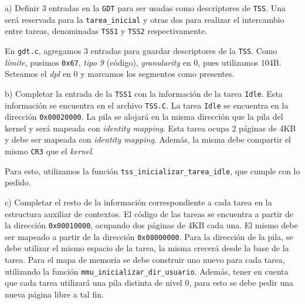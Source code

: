 \noindent
a) Definir 3 entradas en la \verb|GDT| para ser usadas como descriptores de \verb|TSS|. Una ser\'a reservada 
para la \verb|tarea_inicial| y otras dos para realizar el intercambio entre tareas, denominadas \verb|TSS1| 
y \verb|TSS2| respectivamente.

\vspace*{0.3cm}

En \verb|gdt.c|, agregamos 3 entradas para guardar descriptores de la \verb|TSS|. Como \textit{l\'imite}, pusimos \verb|0x67|, 
\textit{tipo 9} (c\'odigo), \textit{granularity} en 0, pues utilizamos 104B. Seteamos el \textit{dpl} en 0 y marcamos los segmentos 
como presentes. 

\vspace*{0.5cm} \noindent



\noindent
b) Completar la entrada de la \verb|TSS1| con la informaci\'on de la tarea \verb|Idle|. Esta informaci\'on se
encuentra en el archivo \verb|TSS.C|. La tarea \verb|Idle| se encuentra en la direcci\'on \verb|0x00020000|. La 
pila se alojar\'a en la misma direcci\'on que la pila del kernel y ser\'a mapeada con \textit{identity mapping}. 
Esta tarea ocupa 2 p\'aginas  de 4KB y debe ser mapeada con \textit{identity mapping}. Adem\'as, la misma debe 
compartir el mismo \verb|CR3| que el \textit{kernel}.

\vspace*{0.3cm}

Para esto, utilizamos la funci\'on \verb|tss_inicializar_tarea_idle|, que cumple con lo pedido.

\vspace*{0.5cm} \noindent



\noindent
c) Completar el resto de la informaci\'on correspondiente a cada tarea en la estructura auxiliar de contextos. El 
c\'odigo de las tareas se encuentra a partir de la direcci\'on \verb|0x00010000|, ocupando dos p\'aginas de 4KB cada una. 
El mismo debe ser mapeado a partir de la direcci\'on \verb|0x08000000|. Para la direcci\'on de la pila, se debe utilizar 
el mismo espacio de la tarea, la misma crecer\'a desde la base de la tarea. Para el mapa de memoria se debe construir uno 
nuevo para cada tarea, utilizando la funci\'on \verb|mmu_inicializar_dir_usuario|. Adem\'as, tener en cuenta que cada tarea 
utilizar\'a una pila distinta de nivel 0, para esto se debe pedir una nueva p\'agina libre a tal fin. 


\vspace*{0.3cm}

